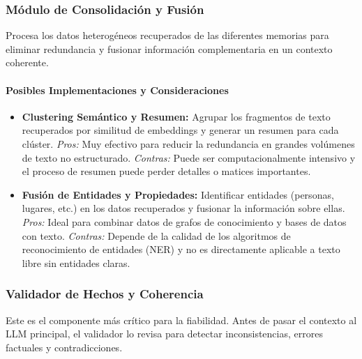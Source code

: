 \documentclass[journal,onecolumn]{IEEEtran}
\begin{document}
\subsubsection{Módulo de Consolidación y Fusión}
Procesa los datos heterogéneos recuperados de las diferentes memorias para eliminar redundancia y fusionar información complementaria en un contexto coherente.
\paragraph{Posibles Implementaciones y Consideraciones}
\begin{itemize}
    \item \textbf{Clustering Semántico y Resumen:} Agrupar los fragmentos de texto recuperados por similitud de embeddings y generar un resumen para cada clúster. \textit{Pros:} Muy efectivo para reducir la redundancia en grandes volúmenes de texto no estructurado. \textit{Contras:} Puede ser computacionalmente intensivo y el proceso de resumen puede perder detalles o matices importantes.
    \item \textbf{Fusión de Entidades y Propiedades:} Identificar entidades (personas, lugares, etc.) en los datos recuperados y fusionar la información sobre ellas. \textit{Pros:} Ideal para combinar datos de grafos de conocimiento y bases de datos con texto. \textit{Contras:} Depende de la calidad de los algoritmos de reconocimiento de entidades (NER) y no es directamente aplicable a texto libre sin entidades claras.
\end{itemize}

\subsubsection{Validador de Hechos y Coherencia}
Este es el componente más crítico para la fiabilidad. Antes de pasar el contexto al LLM principal, el validador lo revisa para detectar inconsistencias, errores factuales y contradicciones.
\end{document}
